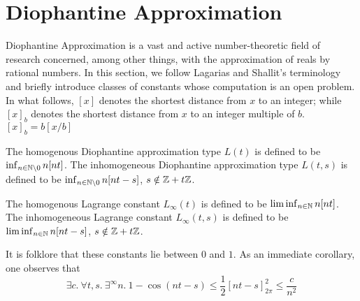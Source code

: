 \section{Diophantine Approximation}
\label{section:diophantine}

Diophantine Approximation is a vast and active number-theoretic field of research concerned, among other things, with the approximation of reals by rational numbers. In this section, we follow Lagarias and Shallit’s terminology \cite{dio-constants} and briefly introduce classes of constants whose computation is an open problem. In what follows, $[x]$ denotes the shortest distance from $x$ to an integer; while $[x]_b$ denotes the shortest distance from $x$ to an integer multiple of $b$. $[x]_b = b[x/b]$

\begin{definition}
\label{def:L}
The homogenous Diophantine approximation type $L(t)$ is defined to be $\inf_{n \in \mathbb{N} \backslash{0}} n[nt]$. The inhomogeneous Diophantine approximation type $L(t, s)$ is defined to be $\inf_{n \in \mathbb{N} \backslash{0}} n[nt - s]$, $s \notin \mathbb{Z} + t\mathbb{Z}$. 
\end{definition} 

\begin{definition}
\label{def:Linfty}
The homogenous Lagrange constant $L_\infty(t)$ is defined to be $\liminf_{n \in \mathbb{N}} n[nt]$. The inhomogeneous Lagrange constant $L_\infty(t, s)$ is defined to be\\ $\liminf_{n \in \mathbb{N}} n[nt - s]$, $s \notin \mathbb{Z} + t\mathbb{Z}$.
\end{definition} 

It is folklore that these constants lie between $0$ and $1$. As an immediate corollary, one observes that
\begin{equation}
\label{eq:quadraticdecay}
\exists c.~\forall t, s.~ \exists^\infty n. ~ 1 - \cos(nt - s) \le \frac{1}{2}\left[nt - s \right]_{2\pi}^2 \le \frac{c}{n^2}
\end{equation}

